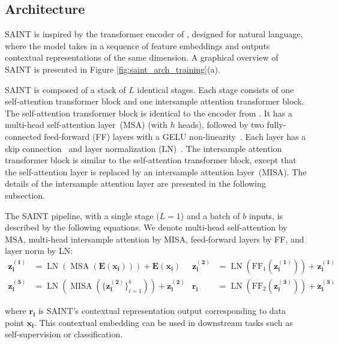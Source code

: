 \documentclass{article}
\newcommand{\op}[1]{\operatorname{#1}}
\newcommand{\mbf}[1]{\mathbf{#1}}
\begin{document}
\subsection{Architecture}

SAINT is inspired by the transformer encoder of \citet{vaswani2017attention}, designed for natural language, where the model takes in a sequence of feature embeddings and outputs contextual representations of the same dimension. A graphical overview of SAINT is presented in Figure \ref{fig:saint_arch_training}(a).

SAINT is composed of a stack of $L$ identical stages. Each stage consists of one self-attention transformer block and one intersample attention transformer block. The self-attention transformer block is identical to the encoder from \cite{vaswani2017attention}. It has a multi-head self-attention layer~(MSA) (with $h$ heads), followed by two fully-connected feed-forward (FF) layers with a GELU non-linearity~\cite{hendrycks2016gaussian}. Each layer has a skip connection~\cite{he2016deep} and layer normalization (LN)~\cite{ba2016layer}. The intersample attention transformer block is similar to the self-attention transformer block, except that the self-attention layer is replaced by an intersample attention layer~(MISA). The details of the intersample attention layer are presented in the following subsection.

The SAINT pipeline, with a single stage ($L=1$) and a batch of $b$ inputs, is described by the following equations. We denote multi-head self-attention by MSA, multi-head intersample attention by MISA, feed-forward layers by FF, and layer norm by LN: 
\begin{align}
    \mbf{z_i^{(1)}} &= \op{LN}(\op{MSA}(\mathbf{E}(\mathbf{x_i}))) + \mathbf{E}(\mathbf{x_i}) & \mbf{z_i^{(2)}} &= \op{LN}(\op{FF_1}(\mbf{z_i^{(1)}})) +\mbf{z_i^{(1)}}
    \label{eq:sa_block_apply} \\
    \mbf{z_i^{(3)}} &= \op{LN}(\op{MISA}(\{\mbf{z_i^{(2)}}\}_{i=1}^b)) +\mbf{z_i^{(2)}} &  \mathbf{r_i}&= \op{LN}(\op{FF_2}(\mbf{z_i^{(3)}})) +\mbf{z_i^{(3)}}
    \label{eq:isa_block_apply} 
\end{align}

where $\mathbf{r_i}$ is SAINT's contextual representation output corresponding to data point $\mathbf{x_i}$. This contextual embedding can be used in downstream tasks such as self-supervision or classification.
\end{document}
